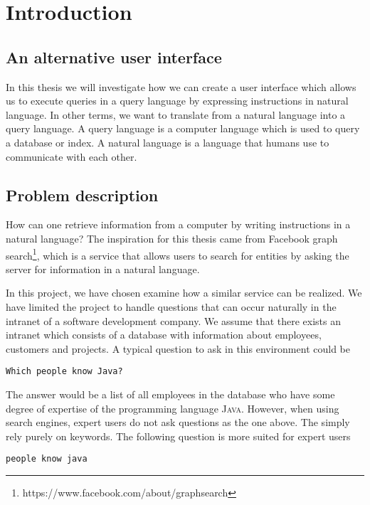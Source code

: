 \chapter{Introduction}\label{ch:introduction}
\section{An alternative user interface}
In this thesis we will investigate how we can create a user interface which allows us to execute queries in a query language by expressing instructions in natural language. In other terms, we want to translate from a natural language into a query language. A query language is a computer language which is used to query a database or index. A natural language is a language that humans use to communicate with each other.

\section{Problem description}
How can one retrieve information from a computer by writing instructions in a natural language? The inspiration for this thesis came from Facebook graph search\footnote{https://www.facebook.com/about/graphsearch}, which is a service that allows users to search for entities by asking the server for information in a natural language.

In this project, we have chosen examine how a similar service can be realized. We have limited the project to handle questions that can occur naturally in the intranet of a software development company. We assume that there exists an intranet which consists of a database with information about employees, customers and projects. A typical question to ask in this environment could be

\begin{verbatim}
Which people know Java?
\end{verbatim}

The answer would be a list of all employees in the database who have some degree of expertise of the programming language \textsc{Java}. However, when using search engines, expert users do not ask questions as the one above. The simply rely purely on keywords. The following question is more suited for expert users

\begin{verbatim}
people know java
\end{verbatim}

